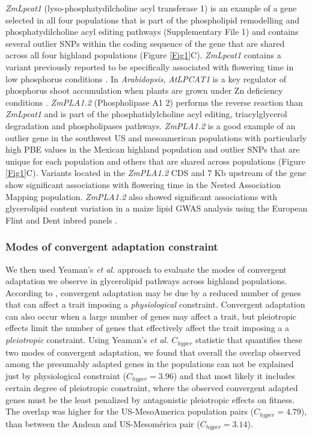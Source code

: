 \documentclass[9pt,twocolumn,twoside]{BioRxiv}
\begin{document}
\textit{ZmLpcat1} (lyso-phosphatydilcholine acyl transferase 1) is an example of a gene selected in all four populations that is part of the phospholipid remodelling and phosphatydilcholine acyl editing pathways (Supplementary File 1) and contains several outlier SNPs within the coding sequence of the gene that are shared across all four highland populations (Figure \ref{Fig1}C). \textit{ZmLpcat1} contains a variant previously reported to be specifically associated with flowering time in low phosphorus conditions \cite{xu2018a}. 
In \textit{Arabidopsis}, \textit{AtLPCAT1} is a key regulator of phosphorus shoot accumulation when plants are grown under Zn deficiency conditions \cite{Kisko2018-zm}.
\textit{ZmPLA1.2} (Phospholipase A1 2) performs the reverse reaction than \textit{ZmLpcat1} and is part of the phosphatidylcholine acyl editing, triacylglycerol degradation and phospholipases pathways. 
\textit{ZmPLA1.2} is a good example of an outlier gene in the southwest US and mesoamerican populations with particularly high PBE values in the Mexican highland population and outlier SNPs that are unique for each population and others that are shared across populations (Figure \ref{Fig1}C). 
Variants located in the \textit{ZmPLA1.2} CDS \cite{Chen2012-gg} and 7 Kb upstream  of the gene \cite{Hung2012-ms} show significant associations with flowering time in the Nested Association Mapping population. \textit{ZmPLA1.2} also showed significant associations with glycerolipid content variation in a maize lipid GWAS analysis using the European Flint and Dent inbred panels \cite{Riedelsheimer2013-bd}.

\subsubsection{Modes of convergent adaptation constraint} 
We then used Yeaman's \textit{et al.} \cite{yeaman2018} approach to evaluate the modes of convergent adaptation we observe in glycerolipid pathways across highland populations. 
According to \cite{yeaman2018}, convergent adaptation may be due by a reduced number of genes that can affect a trait imposing a \textit{physiological} constraint. 
Convergent adaptation can also occur when a large number of genes may affect a trait, but pleiotropic effects limit the number of genes that effectively affect the trait imposing a a \textit{pleiotropic} constraint. 
Using Yeaman's \textit{et al.} $C_{hyper}$ statistic \cite{yeaman2018} that quantifies these two modes of convergent adaptation, we found that overall the overlap observed among the presumably adapted genes in the populations can not be explained just by physiological constraint ($C_{hyper} = 3.96$) and that most likely it includes certain degree of pleiotropic constraint, where the observed convergent adapted genes must be the least penalized by antagonistic pleiotropic effects on fitness.
The overlap was higher for the US-MesoAmerica population pairs ($C_{hyper} = 4.79$), than between the Andean and US-Mesomérica pair ($C_{hyper} = 3.14$).
\end{document}
